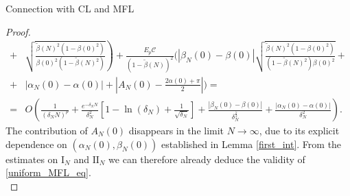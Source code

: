 \documentclass{article}
\theoremstyle{definition}
\begin{document}
\begin{section}{Connection with CL and MFL}
\begin{proof}
\begin{align*}
        +&\left.\sqrt{\frac{\tilde{\beta}(N)^2(1-\beta(0)^2)}{\beta(0)^2(1-\tilde{\beta}(N)^2)}}\right)+\frac{E_p\mathcal{C}}{(1-\tilde{\beta}(N))^2}\Bigg(|\beta_N(0)-\beta(0)|\sqrt{\frac{\tilde{\beta}(N)^2(1-\beta(0)^2)}{(1-\tilde{\beta}(N)^2)\beta(0)^2}}+\\
        +&|\alpha_N(0)-\alpha(0)|+\left|A_N(0)-\frac{2\alpha(0)+\pi}{2}\right|\Bigg)=\\
        =&O\left(\frac{1}{\left(\delta_NN\right)^p}+\frac{e^{-\delta_NN}}{\delta_N^2}\left[1-\ln\left(\delta_N\right)+\frac{1}{\sqrt{\delta_N}}\right]+\frac{|\beta_N(0)-\beta(0)|}{\delta_N^{\frac{5}{2}}}+\frac{|\alpha_N(0)-\alpha(0)|}{\delta_N^{2}}\right).
    \end{align*}
    The contribution of $A_N(0)$ disappears in the limit $N\to\infty$, due to its explicit dependence on $(\alpha_N(0),\beta_N(0))$ established in Lemma \ref{first_int}.
    From the estimates on $\mathrm{I}_N$ and $\mathrm{II}_N$ we can therefore already deduce the validity of \eqref{uniform_MFL_eq}.\\


\end{proof}
\end{section}
\end{document}
